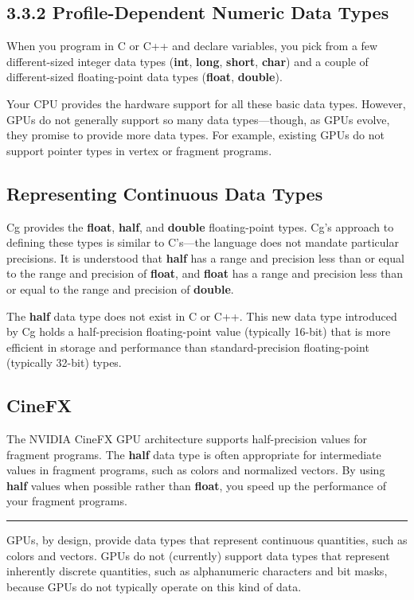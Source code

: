 \documentclass[../main.tex]{subfiles}
\begin{document}
\subsection{3.3.2 Profile-Dependent Numeric Data Types}

When you program in C or C++ and declare variables, you pick from a few different-sized integer data types (\textbf{int}, \textbf{long}, \textbf{short}, \textbf{char}) and a couple of different-sized floating-point data types (\textbf{float}, \textbf{double}).

Your CPU provides the hardware support for all these basic data types. However, GPUs do not generally support so many data types—though, as GPUs evolve, they promise to provide more data types. For example, existing GPUs do not support pointer types in vertex or fragment programs.

\subsection*{Representing Continuous Data Types}

Cg provides the \textbf{float}, \textbf{half}, and \textbf{double} floating-point types. Cg's approach to defining these types is similar to C's—the language does not mandate particular precisions. It is understood that \textbf{half} has a range and precision less than or equal to the range and precision of \textbf{float}, and \textbf{float} has a range and precision less than or equal to the range and precision of \textbf{double}.

The \textbf{half} data type does not exist in C or C++. This new data type introduced by Cg holds a half-precision floating-point value (typically 16-bit) that is more efficient in storage and performance than standard-precision floating-point (typically 32-bit) types.

\subsection*{CineFX}

The NVIDIA CineFX GPU architecture supports half-precision values for fragment programs. The \textbf{half} data type is often appropriate for intermediate values in fragment programs, such as colors and normalized vectors. By using \textbf{half} values when possible rather than \textbf{float}, you speed up the performance of your fragment programs.
\hrule

GPUs, by design, provide data types that represent continuous quantities, such as colors and vectors. GPUs do not (currently) support data types that represent inherently discrete quantities, such as alphanumeric characters and bit masks, because GPUs do not typically operate on this kind of data.
\end{document}
